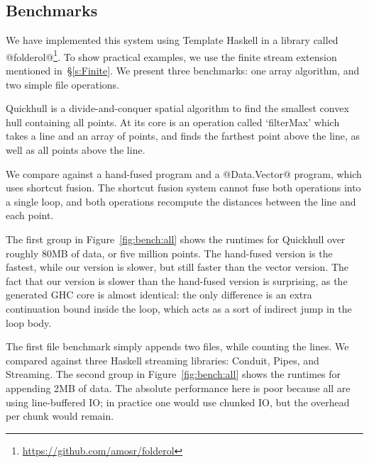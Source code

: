 

\subsection{Benchmarks}
We have implemented this system using Template Haskell in a library called @folderol@\footnote{\url{https://github.com/amosr/folderol}}.
To show practical examples, we use the finite stream extension mentioned in~\S\ref{s:Finite}.
We present three benchmarks: one array algorithm, and two simple file operations.


Quickhull is a divide-and-conquer spatial algorithm to find the smallest convex hull containing all points.
At its core is an operation called `filterMax' which takes a line and an array of points, and finds the farthest point above the line, as well as all points above the line.

We compare against a hand-fused program and a @Data.Vector@ program, which uses shortcut fusion.
The shortcut fusion system cannot fuse both operations into a single loop, and both operations recompute the distances between the line and each point.

The first group in Figure~\ref{fig:bench:all} shows the runtimes for Quickhull over roughly 80MB of data, or five million points.
The hand-fused version is the fastest, while our version is slower, but still faster than the vector version.
The fact that our version is slower than the hand-fused version is surprising, as the generated GHC core is almost identical: the only difference is an extra continuation bound inside the loop, which acts as a sort of indirect jump in the loop body.

The first file benchmark simply appends two files, while counting the lines.
We compared against three Haskell streaming libraries: Conduit, Pipes, and Streaming.
The second group in Figure~\ref{fig:bench:all} shows the runtimes for appending 2MB of data.
The absolute performance here is poor because all are using line-buffered IO; in practice one would use chunked IO, but the overhead per chunk would remain.

